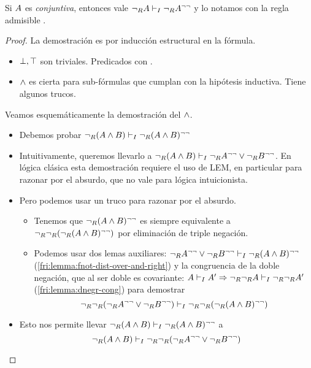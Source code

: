 \begin{lemma}
    \label{fri:lemma:notr-trans-intro}
    Si $A$ es \textit{conjuntiva}, entonces vale $\neg_R A \vdash_I \neg_R A^{\neg\neg}$ y lo notamos con la regla admisible .
\end{lemma}
\begin{proof}
    La demostración es por inducción estructural en la fórmula.
    \begin{itemize}
        \item $\bot, \top$ son triviales. Predicados con .
        \item $\wedge$ es cierta para sub-fórmulas que cumplan con la hipótesis inductiva. Tiene algunos trucos.
    \end{itemize}

    Veamos esquemáticamente la demostración del $\wedge$.
    \begin{itemize}
        \item Debemos probar $\neg_R (A \wedge B) \vdash_I \neg_R (A \wedge B)^{\neg\neg}$
        \item Intuitivamente, queremos llevarlo a $\neg_R (A \wedge B) \vdash_I \neg_R A^{\neg\neg} \vee \neg_R B^{\neg\neg}$. En lógica clásica esta demostración requiere el uso de LEM, en particular   para razonar por el absurdo, que no vale para lógica intuicionista.
        \item Pero podemos usar un truco para razonar por el absurdo.
        \begin{itemize}
        \item Tenemos que $\neg_R (A \wedge B)^{\neg\neg}$ es siempre equivalente a $\neg_R \neg_R (\neg_R (A \wedge B)^{\neg\neg})$ por eliminación de triple negación.
        \item Podemos usar dos lemas auxiliares: $\neg_R A^{\neg\neg} \vee \neg_R B^{\neg\neg} \vdash_I \neg_R (A \wedge B)^{\neg\neg}$ (\ref{fri:lemma:fnot-dist-over-and-right}) y la congruencia de la doble negación, que al ser doble es covariante: $A \vdash_I A' \Rightarrow \neg_R \neg_R A \vdash_I \neg_R \neg_R A'$ (\ref{fri:lemma:dnegr-cong}) para demostrar 
        \[
            \neg_R \neg_R (\neg_R A^{\neg\neg} \vee \neg_R B^{\neg\neg})
            \vdash_I
            \neg_R \neg_R (\neg_R (A \wedge B)^{\neg\neg})
        \]
        \end{itemize}
        \item Esto nos permite llevar $\neg_R (A \wedge B) \vdash_I \neg_R (A \wedge B)^{\neg\neg}$ a \[\neg_R (A \wedge B) \vdash_I \neg_R \neg_R (\neg_R A^{\neg\neg} \vee \neg_R B^{\neg\neg})\]
        

\end{itemize}
\end{proof}
